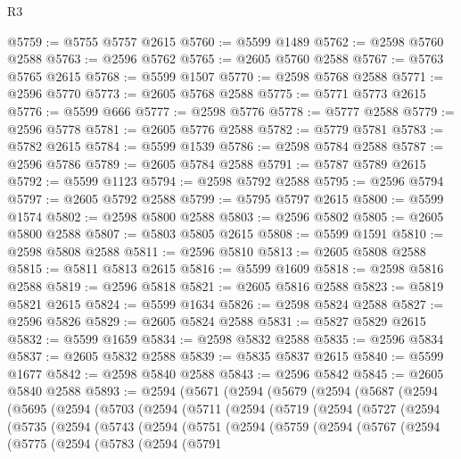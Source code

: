 \begin{lexlean}{R3}
\begin{coremodule}
@5759 := @5755 @5757 @2615
@5760 := @5599 @1489
@5762 := @2598 @5760 @2588
@5763 := @2596 @5762
@5765 := @2605 @5760 @2588
@5767 := @5763 @5765 @2615
@5768 := @5599 @1507
@5770 := @2598 @5768 @2588
@5771 := @2596 @5770
@5773 := @2605 @5768 @2588
@5775 := @5771 @5773 @2615
@5776 := @5599 @666
@5777 := @2598 @5776
@5778 := @5777 @2588
@5779 := @2596 @5778
@5781 := @2605 @5776 @2588
@5782 := @5779 @5781
@5783 := @5782 @2615
@5784 := @5599 @1539
@5786 := @2598 @5784 @2588
@5787 := @2596 @5786
@5789 := @2605 @5784 @2588
@5791 := @5787 @5789 @2615
@5792 := @5599 @1123
@5794 := @2598 @5792 @2588
@5795 := @2596 @5794
@5797 := @2605 @5792 @2588
@5799 := @5795 @5797 @2615
@5800 := @5599 @1574
@5802 := @2598 @5800 @2588
@5803 := @2596 @5802
@5805 := @2605 @5800 @2588
@5807 := @5803 @5805 @2615
@5808 := @5599 @1591
@5810 := @2598 @5808 @2588
@5811 := @2596 @5810
@5813 := @2605 @5808 @2588
@5815 := @5811 @5813 @2615
@5816 := @5599 @1609
@5818 := @2598 @5816 @2588
@5819 := @2596 @5818
@5821 := @2605 @5816 @2588
@5823 := @5819 @5821 @2615
@5824 := @5599 @1634
@5826 := @2598 @5824 @2588
@5827 := @2596 @5826
@5829 := @2605 @5824 @2588
@5831 := @5827 @5829 @2615
@5832 := @5599 @1659
@5834 := @2598 @5832 @2588
@5835 := @2596 @5834
@5837 := @2605 @5832 @2588
@5839 := @5835 @5837 @2615
@5840 := @5599 @1677
@5842 := @2598 @5840 @2588
@5843 := @2596 @5842
@5845 := @2605 @5840 @2588
@5893 := @2594
    (@5671
      (@2594
        (@5679
          (@2594
            (@5687
              (@2594
                (@5695
                  (@2594
                    (@5703
                      (@2594
                        (@5711
                          (@2594
                            (@5719
                              (@2594
                                (@5727
                                  (@2594
                                    (@5735
                                      (@2594
                                        (@5743
                                          (@2594
                                            (@5751
                                              (@2594
                                                (@5759
                                                  (@2594
                                                    (@5767
                                                      (@2594
                                                        (@5775
                                                          (@2594
                                                            (@5783
                                                              (@2594
                                                                (@5791

\end{coremodule}
\end{lexlean}
